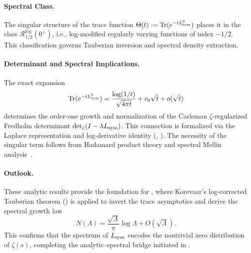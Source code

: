 \paragraph{Spectral Class.}
The singular structure of the trace function \( \Theta(t) := \operatorname{Tr}(e^{-t L_{\mathrm{sym}}^2}) \) places it in the class \( \mathcal{R}_{1/2}^{\log}(0^+) \), i.e., log-modified regularly varying functions of index \( -1/2 \). This classification governs Tauberian inversion and spectral density extraction.

\paragraph{Determinant and Spectral Implications.}
The exact expansion
\[
\operatorname{Tr}(e^{-t L_{\mathrm{sym}}^2}) = \frac{\log(1/t)}{\sqrt{4\pi t}} + c_0 \sqrt{t} + o(\sqrt{t})
\]
determines the order-one growth and normalization of the Carleman \(\zeta\)-regularized Fredholm determinant \( \det\nolimits_{\zeta}(I - \lambda L_{\mathrm{sym}}) \). This connection is formalized via the Laplace representation and log-derivative identity (, ). The necessity of the singular term follows from Hadamard product theory and spectral Mellin analysis~\cite[Ch.~III]{Korevaar2004Tauberian}.

\paragraph{Outlook.}
These analytic results provide the foundation for , where Korevaar’s log-corrected Tauberian theorem () is applied to invert the trace asymptotics and derive the spectral growth law
\[
N(\Lambda) = \frac{\sqrt{\Lambda}}{\pi} \log \Lambda + O(\sqrt{\Lambda}).
\]
This confirms that the spectrum of \( L_{\mathrm{sym}} \) encodes the nontrivial zero distribution of \( \zeta(s) \), completing the analytic–spectral bridge initiated in .
